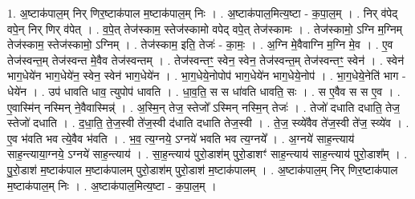 \documentclass[17pt]{extarticle}
\begin{document}
1. अ॒ष्टाक॑पाल॒म् निर् णिर॒ष्टाक॑पाल म॒ष्टाक॑पाल॒म् निः । . अ॒ष्टाक॑पाल॒मित्य॒ष्टा - क॒पा॒ल॒म् । . निर् व॑पेद् वपे॒न् निर् णिर् व॑पेत् । . व॒पे॒त् तेज॑स्काम॒ स्तेज॑स्कामो वपेद् वपे॒त् तेज॑स्कामः । . तेज॑स्कामो॒ ऽग्नि म॒ग्निम् तेज॑स्काम॒ स्तेज॑स्कामो॒ ऽग्निम् । . तेज॑स्काम॒ इति॒ तेजः॑ - का॒मः॒ । . अ॒ग्नि मे॒वैवाग्नि म॒ग्नि मे॒व । . ए॒व तेज॑स्वन्त॒म् तेज॑स्वन्त मे॒वैव तेज॑स्वन्तम् । . तेज॑स्वन्तꣳ॒॒ स्वेन॒ स्वेन॒ तेज॑स्वन्त॒म् तेज॑स्वन्तꣳ॒॒ स्वेन॑ । . स्वेन॑ भाग॒धेये॑न भाग॒धेये॑न॒ स्वेन॒ स्वेन॑ भाग॒धेये॑न । . भा॒ग॒धेये॒नोपोप॑ भाग॒धेये॑न भाग॒धेये॒नोप॑ । . भा॒ग॒धेये॒नेति॑ भाग - धेये॑न । . उप॑ धावति धाव॒ त्युपोप॑ धावति । . धा॒व॒ति॒ स स धा॑वति धावति॒ सः । . स ए॒वैव स स ए॒व । . ए॒वास्मि॑न् नस्मिन् ने॒वैवास्मिन्न्॑ । . अ॒स्मि॒न् तेज॒ स्तेजो᳚ ऽस्मिन् नस्मि॒न् तेजः॑ । . तेजो॑ दधाति दधाति॒ तेज॒ स्तेजो॑ दधाति । . द॒धा॒ति॒ ते॒ज॒स्वी ते॑ज॒स्वी द॑धाति दधाति तेज॒स्वी । . ते॒ज॒ स्व्ये॑वैव ते॑ज॒स्वी ते॑ज॒ स्व्ये॑व । . ए॒व भ॑वति भव त्ये॒वैव भ॑वति । . भ॒व॒ त्य॒ग्नये॒ ऽग्नये॑ भवति भव त्य॒ग्नये᳚ । . अ॒ग्नये॑ साह॒न्त्याय॑ साह॒न्त्याया॒ग्नये॒ ऽग्नये॑ साह॒न्त्याय॑ । . सा॒ह॒न्त्याय॑ पुरो॒डाश॑म् पुरो॒डाशꣳ॑ साह॒न्त्याय॑ साह॒न्त्याय॑ पुरो॒डाश᳚म् । . पु॒रो॒डाश॑ म॒ष्टाक॑पाल म॒ष्टाक॑पालम् पुरो॒डाश॑म् पुरो॒डाश॑ म॒ष्टाक॑पालम् । . अ॒ष्टाक॑पाल॒म् निर् णिर॒ष्टाक॑पाल म॒ष्टाक॑पाल॒म् निः । . अ॒ष्टाक॑पाल॒मित्य॒ष्टा - क॒पा॒ल॒म् । \newline
\end{document}

